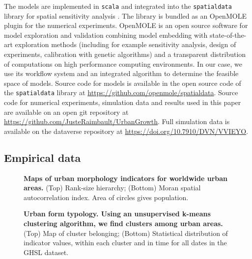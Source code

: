 \documentclass[10pt,letterpaper]{article}
\begin{document}
The models are implemented in \texttt{scala} and integrated into the \texttt{spatialdata} library for spatial sensitivity analysis \cite{raimbault2020scala}. The library is bundled as an OpenMOLE plugin for the numerical experiments. OpenMOLE is an open source software for model exploration and validation \cite{reuillon2013openmole} combining model embedding with state-of-the-art exploration methods (including for example sensitivity analysis, design of experiments, calibration with genetic algorithms) and a transparent distribution of computations on high performance computing environments. In our case, we use its workflow system and an integrated algorithm to determine the feasible space of models. Source code for models is available in the open source code of the \texttt{spatialdata} library at \url{https://github.com/openmole/spatialdata}. Source code for numerical experiments, simulation data and results used in this paper are available on an open git repository at \url{https://github.com/JusteRaimbault/UrbanGrowth}. Full simulation data is available on the dataverse repository at \url{https://doi.org/10.7910/DVN/VVIEYO}.



\subsection*{Empirical data}



\begin{figure}[!h]
	\vspace{2cm}
	\caption{{\bf Maps of urban morphology indicators for worldwide urban areas.} (Top) Rank-size hierarchy; (Bottom) Moran spatial autocorrelation index. Area of circles gives population.\label{fig:fig1}}
\end{figure}


\begin{figure}[!h]
	\vspace{2cm}
	\caption{{\bf Urban form typology. Using an unsupervised k-means clustering algorithm, we find clusters among urban areas.} (Top) Map of cluster belonging; (Bottom) Statistical distribution of indicator values, within each cluster and in time for all dates in the GHSL dataset.\label{fig:fig2}}
\end{figure}
\end{document}
